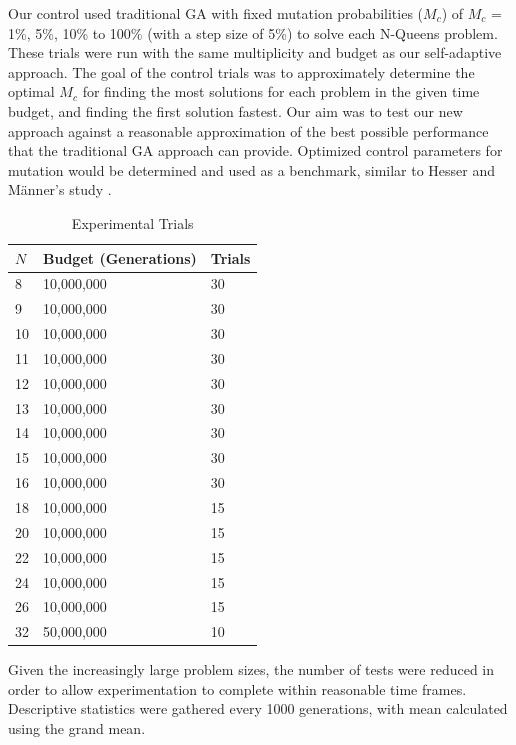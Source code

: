 \documentclass[conference]{IEEEtran}
\begin{document}
Our control used traditional GA with fixed mutation probabilities ($M_{c}$) of $M_{c}$ = 1\%, 5\%, 10\% to 100\% (with a step size of 5\%) to solve each N-Queens problem. These trials were run with the same multiplicity and budget as our self-adaptive approach. The goal of the control trials was to approximately determine the optimal $M_{c}$ for finding the most solutions for each problem in the given time budget, and finding the first solution fastest. Our aim was to test our new approach against a reasonable approximation of the best possible performance that the traditional GA approach can provide. Optimized control parameters for mutation would be determined and used as a benchmark, similar to Hesser and M\"{a}nner's study \cite{cit:14}.

\begin{table}
\centering
\caption{Experimental Trials}
\begin{tabular}{|l|l|l|} \hline
$N$&        Budget (Generations)&     Trials \\ \hline
8&          10,000,000&         30 \\ \hline
9&          10,000,000&         30 \\ \hline
10&         10,000,000&         30 \\ \hline
11&         10,000,000&         30 \\ \hline
12&         10,000,000&         30 \\ \hline
13&         10,000,000&         30 \\ \hline
14&         10,000,000&         30 \\ \hline
15&         10,000,000&         30 \\ \hline
16&         10,000,000&         30 \\ \hline
18&         10,000,000&         15 \\ \hline
20&         10,000,000&         15 \\ \hline
22&         10,000,000&         15 \\ \hline
24&         10,000,000&         15 \\ \hline
26&         10,000,000&         15 \\ \hline
32&         50,000,000&         10 \\ \hline
\end{tabular}
\label{table:trials}
\end{table}

Given the increasingly large problem sizes, the number of tests were reduced in order to allow experimentation to complete within reasonable time frames. Descriptive statistics were gathered every 1000 generations, with mean calculated using the grand mean.
\end{document}
